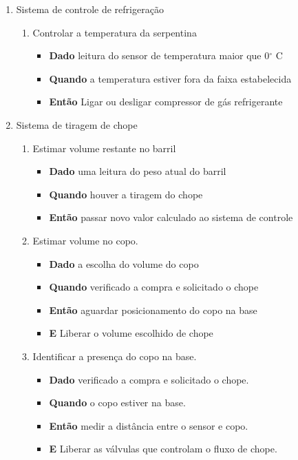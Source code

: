 		\begin{enumerate}
			\item Sistema de controle de refrigeração
				\begin{enumerate}
					\item Controlar a temperatura da serpentina
						\begin{itemize}
							\item \textbf{Dado} leitura do sensor de temperatura maior que 0$^{\circ}$ C
							\item \textbf{Quando} a temperatura estiver fora da faixa estabelecida
							\item \textbf{Então} Ligar ou desligar compressor de gás refrigerante
						\end{itemize}
				\end{enumerate}

				\item Sistema de tiragem de chope
				\begin{enumerate}
					\item Estimar volume restante no barril
						\begin{itemize}
							\item \textbf{Dado} uma leitura do  peso atual do barril
							\item \textbf{Quando} houver a tiragem do chope
							\item \textbf{Então} passar novo valor calculado ao sistema de controle
						\end{itemize}

				\item Estimar volume no  copo.
						\begin{itemize}
							\item \textbf{Dado} a escolha do volume do copo
							\item \textbf{Quando} verificado a compra e solicitado o chope
							\item \textbf{Então} aguardar posicionamento do copo na base
							\item \textbf{E} Liberar o  volume escolhido de chope
						\end{itemize}

				\item Identificar a presença do copo na base.
						\begin{itemize}
							\item \textbf{Dado} verificado a compra e solicitado o chope.
							\item \textbf{Quando} o copo estiver na base.
							\item \textbf{Então} medir a distância entre o sensor e copo.
							\item \textbf{E} Liberar as válvulas que controlam o fluxo de chope.
						\end{itemize}


\end{enumerate}
\end{enumerate}
